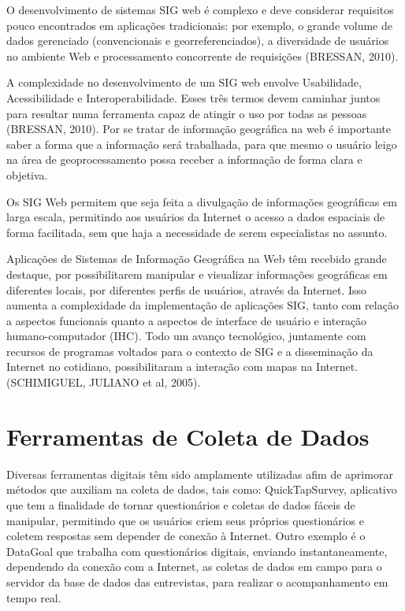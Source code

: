 \documentclass[
	12pt,				%
    oneside,			%
	a4paper,			%
	english,			%
	french,				%
	spanish,			%
	brazil,				%
	]{abntex2}
\begin{document}
O desenvolvimento de sistemas SIG web é complexo e deve considerar requisitos pouco encontrados em aplicações tradicionais: por exemplo, o grande volume de dados gerenciado (convencionais e georreferenciados), a diversidade de usuários no ambiente Web e processamento concorrente de requisições (BRESSAN, 2010).

A complexidade no desenvolvimento de um SIG web envolve Usabilidade, Acessibilidade e Interoperabilidade. Esses três termos devem caminhar juntos para resultar numa ferramenta capaz de atingir o uso por todas as pessoas (BRESSAN, 2010). Por se tratar de informação geográfica na web é importante saber a forma que a informação será trabalhada, para que mesmo o usuário leigo na área de geoprocessamento possa receber a informação de forma clara e objetiva.

Os SIG Web permitem que seja feita a divulgação de informações geográficas em larga escala, permitindo aos usuários da Internet o acesso a dados espaciais de forma facilitada, sem que haja a necessidade de serem especialistas no assunto.

Aplicações de Sistemas de Informação Geográfica na Web têm recebido grande destaque, por possibilitarem manipular e visualizar informações geográficas em diferentes locais, por diferentes perfis de usuários, através da Internet. Isso aumenta a complexidade da implementação de aplicações SIG, tanto com relação a aspectos funcionais quanto a aspectos de interface de usuário e interação humano-computador (IHC). Todo um avanço tecnológico, juntamente com recursos de programas voltados para o contexto de SIG e a disseminação da Internet no cotidiano, possibilitaram a interação com mapas na Internet. (SCHIMIGUEL, JULIANO et al, 2005).


\section{Ferramentas de Coleta de Dados}

Diversas ferramentas digitais têm sido amplamente utilizadas afim de aprimorar métodos que auxiliam na coleta de dados, tais como: QuickTapSurvey, aplicativo que tem a finalidade de tornar questionários e coletas de dados fáceis de manipular, permitindo que os usuários criem seus próprios questionários e coletem respostas sem depender de conexão à Internet. 
Outro exemplo é o DataGoal que trabalha com questionários digitais, enviando instantaneamente, dependendo da conexão com a Internet, as coletas de dados em campo para o servidor da base de dados das entrevistas, para realizar o acompanhamento em tempo real.
\end{document}
